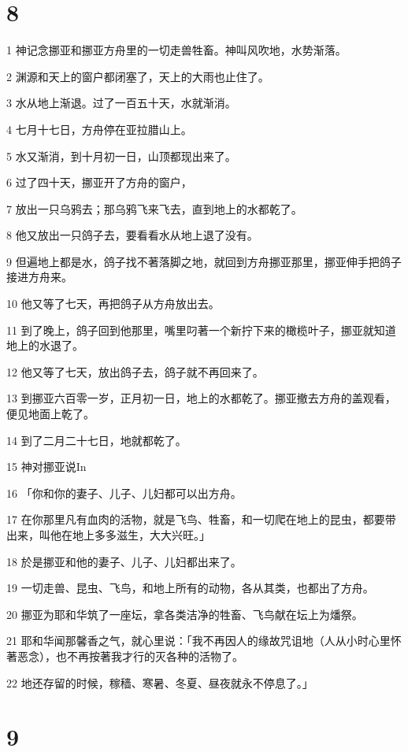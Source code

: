 \chapter{8}

\par 1 神记念挪亚和挪亚方舟里的一切走兽牲畜。神叫风吹地，水势渐落。
\par 2 渊源和天上的窗户都闭塞了，天上的大雨也止住了。
\par 3 水从地上渐退。过了一百五十天，水就渐消。
\par 4 七月十七日，方舟停在亚拉腊山上。
\par 5 水又渐消，到十月初一日，山顶都现出来了。
\par 6 过了四十天，挪亚开了方舟的窗户，
\par 7 放出一只乌鸦去；那乌鸦飞来飞去，直到地上的水都乾了。
\par 8 他又放出一只鸽子去，要看看水从地上退了没有。
\par 9 但遍地上都是水，鸽子找不著落脚之地，就回到方舟挪亚那里，挪亚伸手把鸽子接进方舟来。
\par 10 他又等了七天，再把鸽子从方舟放出去。
\par 11 到了晚上，鸽子回到他那里，嘴里叼著一个新拧下来的橄榄叶子，挪亚就知道地上的水退了。
\par 12 他又等了七天，放出鸽子去，鸽子就不再回来了。
\par 13 到挪亚六百零一岁，正月初一日，地上的水都乾了。挪亚撤去方舟的盖观看，便见地面上乾了。
\par 14 到了二月二十七日，地就都乾了。
\par 15 神对挪亚说In
\par 16 「你和你的妻子、儿子、儿妇都可以出方舟。
\par 17 在你那里凡有血肉的活物，就是飞鸟、牲畜，和一切爬在地上的昆虫，都要带出来，叫他在地上多多滋生，大大兴旺。」
\par 18 於是挪亚和他的妻子、儿子、儿妇都出来了。
\par 19 一切走兽、昆虫、飞鸟，和地上所有的动物，各从其类，也都出了方舟。
\par 20 挪亚为耶和华筑了一座坛，拿各类洁净的牲畜、飞鸟献在坛上为燔祭。
\par 21 耶和华闻那馨香之气，就心里说：「我不再因人的缘故咒诅地（人从小时心里怀著恶念），也不再按著我才行的灭各种的活物了。
\par 22 地还存留的时候，稼穑、寒暑、冬夏、昼夜就永不停息了。」

\chapter{9}

